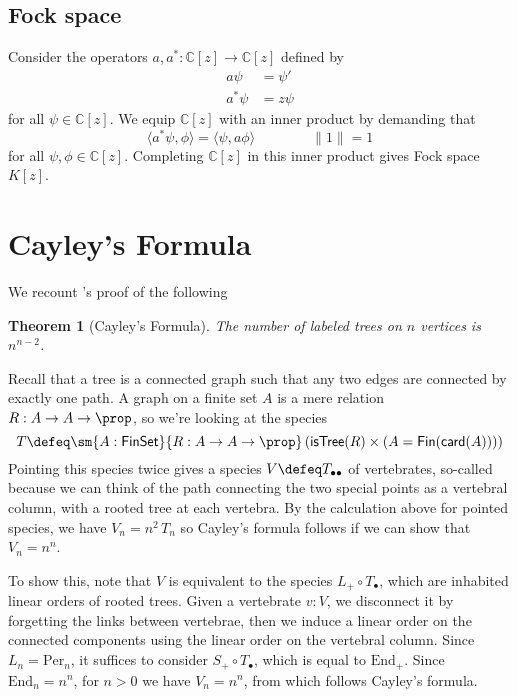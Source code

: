 \documentclass[fleqn]{article}
\newcommand{\card}{\mathsf{card}}
\newcommand{\fin}{\mathsf{Fin}}
\newcommand{\finset}{\mathsf{FinSet}}
\newcommand{\inner}[2]{\langle #1, #2 \rangle}
\theoremstyle{theorem}
\newtheorem{thm}{Theorem}
\theoremstyle{definition}
\begin{document}
\subsection{Fock space}
Consider the operators $a, a^{*} : \mathbb{C}[z] \to \mathbb{C}[z]$ defined by
\begin{align*}
  a\psi &= \psi' \\
  a^{*}\psi &= z\psi
\end{align*}
for all $\psi \in \mathbb{C}[z]$.  We equip $\mathbb{C}[z]$ with an inner
product by demanding that
\[
  \inner{a^{*}\psi}{\phi} = \inner{\psi}{a\phi}
  \qquad\qquad
  \lVert 1 \rVert = 1
\]
for all $\psi, \phi \in \mathbb{C}[z]$.  Completing $\mathbb{C}[z]$ in this
inner product gives Fock space $K[z]$.

\section{Cayley's Formula}
We recount \citeauthor{Joyal1981}'s proof of the following
\begin{thm}[Cayley's Formula] 
  The number of labeled trees on $n$ vertices is $n^{n-2}$.
\end{thm}

Recall that a tree is a connected graph such that any two edges are connected
by exactly one path.  A graph on a finite set $A$ is a mere relation $R : A
\to A \to \prop$, so we're looking at the species
\[
  T \defeq \sm{A:\finset}{R : A \to A \to \prop}\left(
      \mathsf{isTree}(R) \times (A = \fin(\card(A)))
    \right)
\]
Pointing this species twice gives a species $V \defeq T_{\bullet\bullet}$ of
vertebrates, so-called because we can think of the path connecting the two
special points as a vertebral column, with a rooted tree at each vertebra.  By
the calculation above for pointed species, we have $V_{n} = n^{2}\, T_{n}$ so
Cayley's formula follows if we can show that $V_{n} = n^{n}$.

To show this, note that $V$ is equivalent to the species $L_{+} \circ
T_{\bullet}$, which are inhabited linear orders of rooted trees.  Given a
vertebrate $v : V$, we disconnect it by forgetting the links between vertebrae,
then we induce a linear order on the connected components using the linear
order on the vertebral column.  Since $L_{n} = \mathrm{Per}_{n}$, it suffices
to consider $S_{+} \circ T_{\bullet}$, which is equal to $\mathrm{End}_{+}$.
Since $\mathrm{End}_{n} = n^{n}$, for $n > 0$ we have $V_{n} = n^{n}$, from
which follows Cayley's formula.





\end{document}
